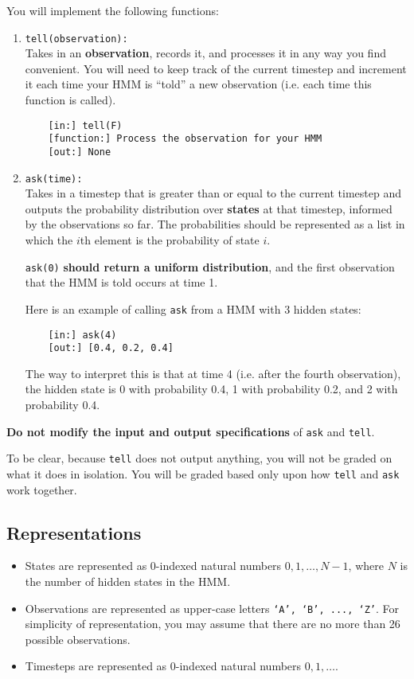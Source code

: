 \documentclass{article}
\begin{document}
You will implement the following functions:
\begin{enumerate}
    \item \texttt{tell(observation):} \\
    Takes in an \textbf{observation}, records it, and processes it in any way you find convenient. You will need to keep track of the current timestep and increment it each time your HMM is ``told'' a new observation (i.e. each time this function is called).
    
    \begin{verbatim}
    [in:] tell(F)
    [function:] Process the observation for your HMM
    [out:] None
    \end{verbatim}

    \item \texttt{ask(time):} \\
    Takes in a timestep that is greater than or equal to the current timestep and outputs the probability distribution over \textbf{states} at that timestep, informed by the observations so far. The probabilities should be represented as a list in which the $i$th element is the probability of state $i$.

    \texttt{ask(0)} \textbf{should return a uniform distribution}, and the first observation that the HMM is told occurs at time 1.

    Here is an example of calling \texttt{ask} from a HMM with 3 hidden states:
    \begin{verbatim}
    [in:] ask(4)
    [out:] [0.4, 0.2, 0.4]
    \end{verbatim}
    The way to interpret this is that at time 4 (i.e. after the fourth observation), the hidden state is 0 with probability 0.4, 1 with probability 0.2, and 2 with probability 0.4.

\end{enumerate}

\textbf{Do not modify the input and output specifications} of \texttt{ask} and \texttt{tell}.

To be clear, because \texttt{tell} does not output anything, you will not be graded on what it does in isolation. You will be graded based only upon how \texttt{tell} and \texttt{ask} work together.

\subsection{Representations}
\begin{itemize}
    \item States are represented as 0-indexed natural numbers $0, 1, \ldots, N - 1$, where $N$ is the number of hidden states in the HMM.
    \item Observations are represented as upper-case letters \texttt{`A', `B', ..., `Z'}.
    For simplicity of representation, you may assume that there are no more than 26 possible observations.
    \item Timesteps are represented as 0-indexed natural numbers $0, 1, \ldots$.
\end{itemize}
\end{document}
